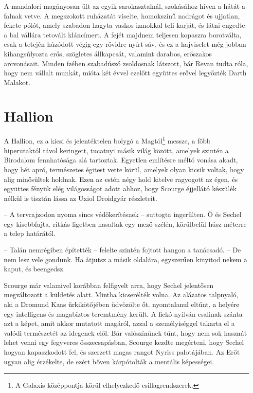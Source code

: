 \documentclass{thesis-ekf}
\theoremstyle{definition}
\begin{document}
A mandalori magányosan ült az egyik sarokasztalnál, szokásához híven a hátát a falnak
vetve. A megszokott ruházatát viselte, homokszínű nadrágot és ujjatlan, fekete pólót, amely
szabadon hagyta vaskos izmokkal teli karját, és látni engedte a bal vállára tetovált kláncímert.
A fejét majdnem teljesen kopaszra borotválta, csak a tetején húzódott végig egy rövidre nyírt
sáv, és ez a hajviselet még jobban kihangsúlyozta erős, szögletes állkapcsát, valamint darabos,
erőszakos arcvonásait. Minden ízében szabadúszó zsoldosnak látszott, bár Revan tudta róla,
hogy nem vállalt munkát, mióta két évvel ezelőtt együttes erővel legyőzték Darth Malakot.
\section{Hallion}
A Hallion, ez a kicsi és jelentéktelen bolygó a Magtól\footnote{A Galaxis középpontja körül elhelyezkedő csillagrendszerek.} messze, a főbb hiperutaktól távol
keringett, tucatnyi másik világ között, amelyek szintén a Birodalom fennhatósága alá tartoztak.
Egyetlen említésre méltó vonása akadt, hogy hét apró, természetes égitest vette körül,
amelyek olyan kicsik voltak, hogy alig minősültek holdnak. Ezen az estén négy hold kitelve
ragyogott az égen, és együttes fényük elég világosságot adott ahhoz, hogy Scourge éjjellátó
készülék nélkül is tisztán lássa az Uxiol Droidgyár részleteit.

-- A tervrajzodon nyoma sincs védőkerítésnek -- suttogta ingerülten.
Ő és Sechel egy kisebbfajta, ritkás ligetben hasaltak egy mező szélén, körülbelül húsz
méterre a telep határától.

-- Talán nemrégiben építették -- felelte szintén fojtott hangon a tanácsadó. -- De nem lesz
vele gondunk. Ha átjutsz a másik oldalára, egyszerűen kinyitod nekem a kaput, és beengedsz.

Scourge már valamivel korábban felfigyelt arra, hogy Sechel jelentősen megváltozott a
küldetés alatt. Mintha kicserélték volna. Az alázatos talpnyaló, aki a Dromund Kaas
űrkikötőjében üdvözölte őt, nyomtalanul eltűnt, a helyére egy intelligens és magabiztos
teremtmény került. A fickó nyilván csalinak szánta azt a képet, amit akkor mutatott magáról,
azzal a személyiséggel takarta el a valódi természetét az idegenek elől. Bár valószínűnek tűnt,
hogy nem sok hasznát lehet venni egy fegyveres összecsapásban, Scourge kezdte megérteni,
hogy Sechel hogyan kapaszkodott fel, és szerzett magas rangot Nyriss palotájában. Az Erőt
ugyan alig érzékelte, de ezért bőven kárpótolták a mentális képességei.
\end{document}
